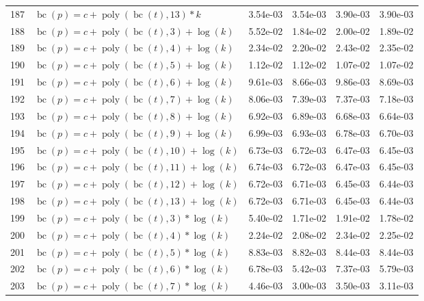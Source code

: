 \documentclass[12pt,a4paper]{article}
\DeclareMathOperator{\bc}{bc}
\DeclareMathOperator{\poly}{poly}
\begin{document}
\begin{longtable}[t]{ll>{\raggedleft\arraybackslash}p{2cm}>{\raggedleft\arraybackslash}p{2cm}>{\raggedleft\arraybackslash}p{2cm}>{\raggedleft\arraybackslash}p{2cm}}
\rowcolor{gray!6}  187 & $\bc(p) = c + \poly\left( \bc(t), 13 \right) * k$ & 3.54e-03 & 3.54e-03 & 3.90e-03 & 3.90e-03\\
188 & $\bc(p) = c + \poly\left( \bc(t), 3 \right) + \log(k)$ & 5.52e-02 & 1.84e-02 & 2.00e-02 & 1.89e-02\\
\rowcolor{gray!6}  189 & $\bc(p) = c + \poly\left( \bc(t), 4 \right) + \log(k)$ & 2.34e-02 & 2.20e-02 & 2.43e-02 & 2.35e-02\\
190 & $\bc(p) = c + \poly\left( \bc(t), 5 \right) + \log(k)$ & 1.12e-02 & 1.12e-02 & 1.07e-02 & 1.07e-02\\
\rowcolor{gray!6}  191 & $\bc(p) = c + \poly\left( \bc(t), 6 \right) + \log(k)$ & 9.61e-03 & 8.66e-03 & 9.86e-03 & 8.69e-03\\
192 & $\bc(p) = c + \poly\left( \bc(t), 7 \right) + \log(k)$ & 8.06e-03 & 7.39e-03 & 7.37e-03 & 7.18e-03\\
\rowcolor{gray!6}  193 & $\bc(p) = c + \poly\left( \bc(t), 8 \right) + \log(k)$ & 6.92e-03 & 6.89e-03 & 6.68e-03 & 6.64e-03\\
194 & $\bc(p) = c + \poly\left( \bc(t), 9 \right) + \log(k)$ & 6.99e-03 & 6.93e-03 & 6.78e-03 & 6.70e-03\\
\rowcolor{gray!6}  195 & $\bc(p) = c + \poly\left( \bc(t), 10 \right) + \log(k)$ & 6.73e-03 & 6.72e-03 & 6.47e-03 & 6.45e-03\\
196 & $\bc(p) = c + \poly\left( \bc(t), 11 \right) + \log(k)$ & 6.74e-03 & 6.72e-03 & 6.47e-03 & 6.45e-03\\
\rowcolor{gray!6}  197 & $\bc(p) = c + \poly\left( \bc(t), 12 \right) + \log(k)$ & 6.72e-03 & 6.71e-03 & 6.45e-03 & 6.44e-03\\
198 & $\bc(p) = c + \poly\left( \bc(t), 13 \right) + \log(k)$ & 6.72e-03 & 6.71e-03 & 6.45e-03 & 6.44e-03\\
\rowcolor{gray!6}  199 & $\bc(p) = c + \poly\left( \bc(t), 3 \right) * \log(k)$ & 5.40e-02 & 1.71e-02 & 1.91e-02 & 1.78e-02\\
200 & $\bc(p) = c + \poly\left( \bc(t), 4 \right) * \log(k)$ & 2.24e-02 & 2.08e-02 & 2.34e-02 & 2.25e-02\\
\rowcolor{gray!6}  201 & $\bc(p) = c + \poly\left( \bc(t), 5 \right) * \log(k)$ & 8.83e-03 & 8.82e-03 & 8.44e-03 & 8.44e-03\\
202 & $\bc(p) = c + \poly\left( \bc(t), 6 \right) * \log(k)$ & 6.78e-03 & 5.42e-03 & 7.37e-03 & 5.79e-03\\
\rowcolor{gray!6}  203 & $\bc(p) = c + \poly\left( \bc(t), 7 \right) * \log(k)$ & 4.46e-03 & 3.00e-03 & 3.50e-03 & 3.11e-03\\

\end{longtable}
\end{document}
